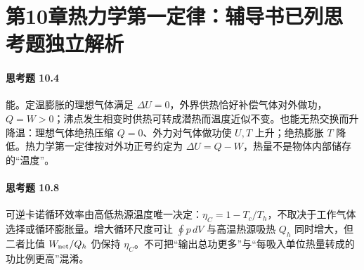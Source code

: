 \section*{第10章\quad 热力学第一定律：辅导书已列思考题独立解析}
\paragraph{思考题 10.4}
能。定温膨胀的理想气体满足 \(\Delta U=0\)，外界供热恰好补偿气体对外做功，\(Q=W>0\)；沸点发生相变时供热可转成潜热而温度近似不变。也能无热交换而升降温：理想气体绝热压缩 \(Q=0\)、外力对气体做功使 \(U,T\) 上升；绝热膨胀 \(T\) 降低。热力学第一定律按对外功正号约定为 \(\boxed{\Delta U=Q-W}\)，热量不是物体内部储存的“温度”。

\paragraph{思考题 10.8}
可逆卡诺循环效率由高低热源温度唯一决定：\(\boxed{\eta_C=1-T_c/T_h}\)，不取决于工作气体选择或循环膨胀量。增大循环尺度可让 \(\oint p\,dV\) 与高温热源吸热 \(Q_h\) 同时增大，但二者比值 \(W_{\rm net}/Q_h\) 仍保持 \(\eta_C\)。不可把“输出总功更多”与“每吸入单位热量转成的功比例更高”混淆。
